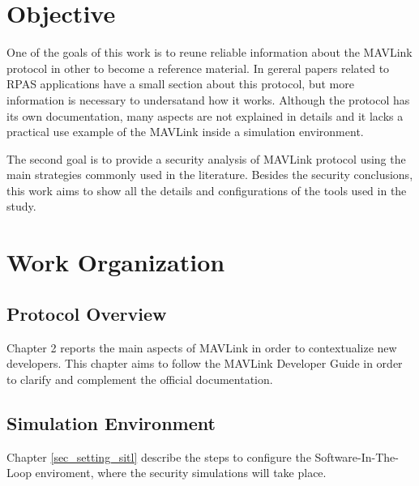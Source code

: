 


\section{Objective}
	One of the goals of this work is to reune reliable information about the MAVLink protocol in other to become a reference material. In gereral papers related to RPAS applications have a small section about this protocol, but more information is necessary  to undersatand how it works. Although the protocol has its own documentation, many aspects are not explained in details and it lacks a practical use example of the MAVLink inside a simulation environment. 
    
    The second goal is to provide a security analysis of MAVLink protocol using the main strategies commonly used in the literature. Besides the security conclusions, this work aims to show all the details and configurations of the tools used in the study.


\section{Work Organization}
\subsection{Protocol Overview}
Chapter 2 reports the main aspects of MAVLink in order to contextualize new developers. This chapter aims to follow the MAVLink Developer Guide in order to clarify and complement the official documentation.

\subsection{Simulation Environment}
Chapter \ref{sec_setting_sitl} describe the steps to configure the Software-In-The-Loop enviroment, where the security simulations will take place.

